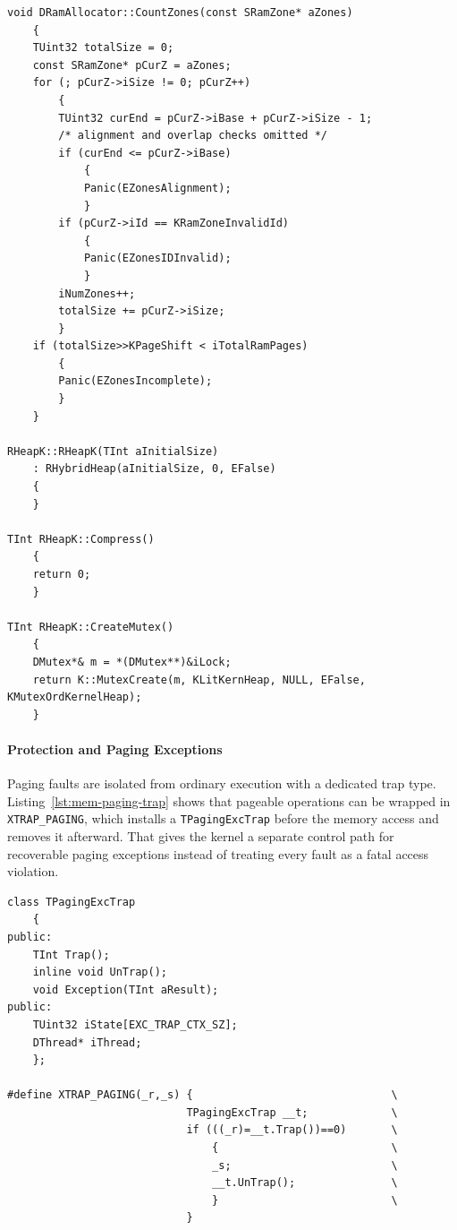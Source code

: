 \begin{listing}[H]
\begin{verbatim}
void DRamAllocator::CountZones(const SRamZone* aZones)
	{
	TUint32 totalSize = 0;
	const SRamZone* pCurZ = aZones;
	for (; pCurZ->iSize != 0; pCurZ++)
		{
		TUint32 curEnd = pCurZ->iBase + pCurZ->iSize - 1;
		/* alignment and overlap checks omitted */
		if (curEnd <= pCurZ->iBase)
			{
			Panic(EZonesAlignment);
			}
		if (pCurZ->iId == KRamZoneInvalidId)
			{
			Panic(EZonesIDInvalid);
			}
		iNumZones++;
		totalSize += pCurZ->iSize;
		}
	if (totalSize>>KPageShift < iTotalRamPages)
		{
		Panic(EZonesIncomplete);
		}
	}

RHeapK::RHeapK(TInt aInitialSize)
	: RHybridHeap(aInitialSize, 0, EFalse)
	{
	}

TInt RHeapK::Compress()
	{
	return 0;
	}

TInt RHeapK::CreateMutex()
	{
	DMutex*& m = *(DMutex**)&iLock;
	return K::MutexCreate(m, KLitKernHeap, NULL, EFalse, KMutexOrdKernelHeap);
	}
\end{verbatim}
\caption{Zone-aware RAM setup and the kernel heap path. Files:
\texttt{ramalloc.cpp} and \texttt{kheap.cpp}.}
\label{lst:mem-ram-heap}
\end{listing}

\paragraph{Protection and Paging Exceptions}

Paging faults are isolated from ordinary execution with a dedicated trap type.
Listing~\ref{lst:mem-paging-trap} shows that pageable operations can be wrapped
in \texttt{XTRAP\_PAGING}, which installs a \texttt{TPagingExcTrap} before the
memory access and removes it afterward. That gives the kernel a separate
control path for recoverable paging exceptions instead of treating every fault
as a fatal access violation.

\begin{listing}[H]
\begin{verbatim}
class TPagingExcTrap
	{
public:
	TInt Trap();
	inline void UnTrap();
	void Exception(TInt aResult);
public:
	TUint32 iState[EXC_TRAP_CTX_SZ];
	DThread* iThread;
	};

#define XTRAP_PAGING(_r,_s)	{								\
							TPagingExcTrap __t;				\
							if (((_r)=__t.Trap())==0)		\
								{							\
								_s;							\
								__t.UnTrap();				\
								}							\
							}
\end{verbatim}
\caption{Paging-exception trapping for pageable kernel accesses. File:
\texttt{kern\_priv.h}.}
\label{lst:mem-paging-trap}
\end{listing}

